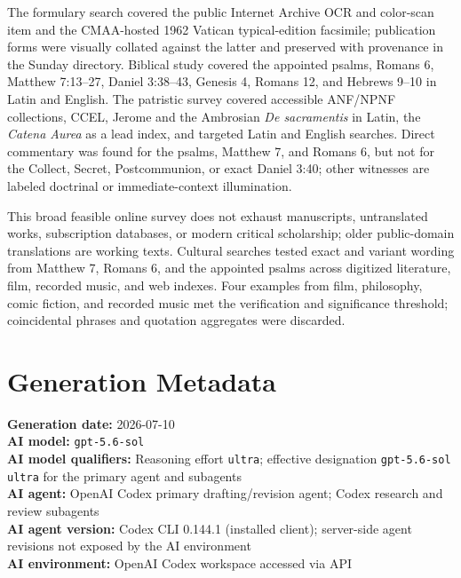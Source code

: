 \begin{deepstudy}
The formulary search covered the public Internet Archive OCR and color-scan item and the CMAA-hosted 1962 Vatican typical-edition facsimile; publication forms were visually collated against the latter and preserved with provenance in the Sunday directory. Biblical study covered the appointed psalms, Romans 6, Matthew 7:13--27, Daniel 3:38--43, Genesis 4, Romans 12, and Hebrews 9--10 in Latin and English. The patristic survey covered accessible ANF/NPNF collections, CCEL, Jerome and the Ambrosian \emph{De sacramentis} in Latin, the \emph{Catena Aurea} as a lead index, and targeted Latin and English searches. Direct commentary was found for the psalms, Matthew 7, and Romans 6, but not for the Collect, Secret, Postcommunion, or exact Daniel 3:40; other witnesses are labeled doctrinal or immediate-context illumination.

This broad feasible online survey does not exhaust manuscripts, untranslated works, subscription databases, or modern critical scholarship; older public-domain translations are working texts. Cultural searches tested exact and variant wording from Matthew 7, Romans 6, and the appointed psalms across digitized literature, film, recorded music, and web indexes. Four examples from film, philosophy, comic fiction, and recorded music met the verification and significance threshold; coincidental phrases and quotation aggregates were discarded.

\section*{Generation Metadata}

{\footnotesize
\textbf{Generation date:} 2026-07-10\\
\textbf{AI model:} \texttt{gpt-5.6-sol}\\
\textbf{AI model qualifiers:} Reasoning effort \texttt{ultra}; effective designation \texttt{gpt-5.6-sol ultra} for the primary agent and subagents\\
\textbf{AI agent:} OpenAI Codex primary drafting/revision agent; Codex research and review subagents\\
\textbf{AI agent version:} Codex CLI 0.144.1 (installed client); server-side agent revisions not exposed by the AI environment\\
\textbf{AI environment:} OpenAI Codex workspace accessed via API\par
}

\end{deepstudy}

